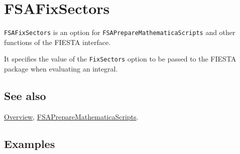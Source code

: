\documentclass[../FeynHelpersManual.tex]{subfiles}
\begin{document}
\begin{Shaded}
\begin{Highlighting}[]
 
\end{Highlighting}
\end{Shaded}

\hypertarget{fsafixsectors}{
\section{FSAFixSectors}\label{fsafixsectors}}

\texttt{FSAFixSectors} is an option for
\texttt{FSAPrepareMathematicaScripts} and other functions of the FIESTA
interface.

It specifies the value of the \texttt{FixSectors} option to be passed to
the FIESTA package when evaluating an integral.

\subsection{See also}

\hyperlink{toc}{Overview},
\hyperlink{fsapreparemathematicascripts}{FSAPrepareMathematicaScripts}.

\subsection{Examples}
\end{document}
